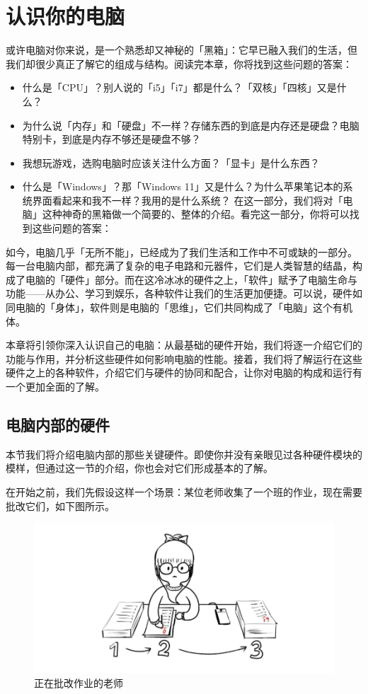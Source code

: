 \chapter{认识你的电脑}
\label{cha:computer-and-its-components}

\begin{intro}
  或许电脑对你来说，是一个熟悉却又神秘的「黑箱」：它早已融入我们的生活，但我们却很少真正了解它的组成与结构。阅读完本章，你将找到这些问题的答案：

  \begin{itemize}
    \item 什么是「CPU」？别人说的「i5」「i7」都是什么？「双核」「四核」又是什么？
    \item 为什么说「内存」和「硬盘」不一样？存储东西的到底是内存还是硬盘？电脑特别卡，到底是内存不够还是硬盘不够？
    \item 我想玩游戏，选购电脑时应该关注什么方面？「显卡」是什么东西？
    \item 什么是「Windows」？那「Windows 11」又是什么？为什么苹果笔记本的系统界面看起来和我不一样？我用的是什么系统？
  在这一部分，我们将对「电脑」这种神奇的黑箱做一个简要的、整体的介绍。看完这一部分，你将可以找到这些问题的答案：
  \end{itemize}
\end{intro}

如今，电脑几乎「无所不能」，已经成为了我们生活和工作中不可或缺的一部分。每一台电脑内部，都充满了复杂的电子电路和元器件，它们是人类智慧的结晶，构成了电脑的「硬件」部分。而在这冷冰冰的硬件之上，「软件」赋予了电脑生命与功能——从办公、学习到娱乐，各种软件让我们的生活更加便捷。可以说，硬件如同电脑的「身体」，软件则是电脑的「思维」，它们共同构成了「电脑」这个有机体。

本章将引领你深入认识自己的电脑：从最基础的硬件开始，我们将逐一介绍它们的功能与作用，并分析这些硬件如何影响电脑的性能。接着，我们将了解运行在这些硬件之上的各种软件，介绍它们与硬件的协同和配合，让你对电脑的构成和运行有一个更加全面的了解。

\section{电脑内部的硬件} 

本节我们将介绍电脑内部的那些关键硬件。即使你并没有亲眼见过各种硬件模块的模样，但通过这一节的介绍，你也会对它们形成基本的了解。

在开始之前，我们先假设这样一个场景：某位老师收集了一个班的作业，现在需要批改它们，如下图所示。

\begin{figure}[htb!]
  \centering
  \includegraphics[width=.5\textwidth]{assets/basic/Teacher_and_homework.png}
  \caption{正在批改作业的老师}
  \label{fig:teacher-and-homework}
\end{figure}

